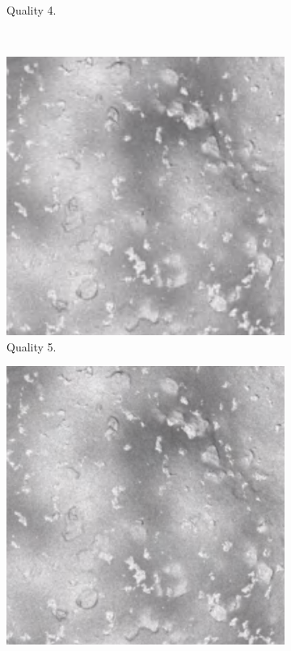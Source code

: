 \begin{figure}[htb]
\begin{subfigure}[b]{0.47\textwidth}
            \caption{Quality 4.}
            \label{fig:img_quality_4}
        \end{subfigure}
        \\
        \begin{subfigure}[b]{0.47\textwidth}
            \centering
            \includegraphics[width=\textwidth]{doc/thesis/0_figures/quality_compare/jp2_5_center.png}
            \caption{Quality 5.}
            \label{fig:img_quality_5}
        \end{subfigure}
        \begin{subfigure}[b]{0.47\textwidth}
            \centering
            \includegraphics[width=\textwidth]{doc/thesis/0_figures/quality_compare/jp2_10_center.png}

\end{subfigure}
\end{figure}
